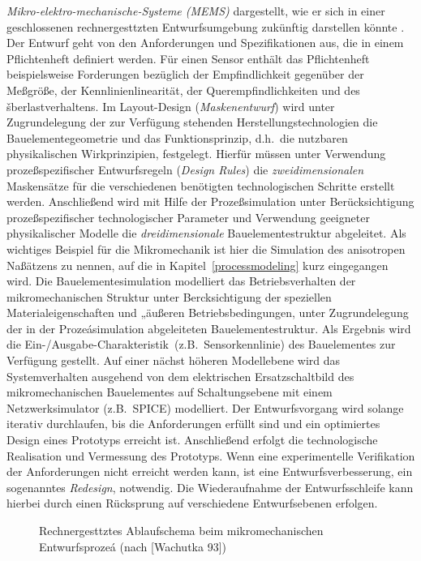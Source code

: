 {\em Mikro-elektro-mechanische-Systeme (MEMS)}
dargestellt, wie er sich in einer geschlossenen rechnergesttzten
Entwurfsumgebung zukünftig darstellen könnte \cite{Wac93}.
Der Entwurf geht von
den Anforderungen und Spezifikationen aus, die in einem Pflichtenheft
definiert werden. Für einen Sensor enthält das Pflichtenheft
beispielsweise Forderungen bezüglich der Empfindlichkeit gegenüber der
Meßgröße, der Kennlinienlinearität, der Querempfindlichkeiten und des
šberlastverhaltens. Im Layout-Design ({\sl Maskenentwurf}) wird unter
Zugrundelegung der zur Verfügung stehenden Herstellungstechnologien die
Bauelementegeometrie und das Funktionsprinzip, d.h.\ die nutzbaren
physikalischen Wirkprinzipien, festgelegt. Hierfür müssen unter Verwendung
prozeßspezifischer Entwurfsregeln ({\sl Design Rules}) die
{\em zweidimensionalen}
Maskensätze für die verschiedenen benötigten technologischen Schritte
erstellt werden.
%
Anschließend wird mit Hilfe der Prozeßsimulation unter Berücksichtigung
prozeßspezifischer technologischer Parameter und Verwendung geeigneter
physikalischer Modelle die {\em dreidimensionale} Bauelementestruktur
abgeleitet. Als wichtiges Beispiel für die Mikromechanik ist hier die
Simulation des anisotropen Naßätzens zu nennen, auf die in
Kapitel~\ref{processmodeling} kurz eingegangen wird.
%
Die Bauelementesimulation modelliert das Betriebsverhalten
der mikromechanischen Struktur unter Bercksichtigung der speziellen
Materialeigenschaften und „äußeren Betriebsbedingungen, unter Zugrundelegung
der in der Prozeásimulation abgeleiteten Bauelementestruktur. Als Ergebnis
wird die \glqq Ein-/Ausgabe-Charakteristik\grqq \, (z.B.\ Sensorkennlinie)
des Bauelementes zur Verfügung gestellt.
%
Auf einer nächst höheren Modellebene wird das Systemverhalten ausgehend von
dem elektrischen Ersatzschaltbild des mikromechanischen Bauelementes auf
Schaltungsebene mit einem Netzwerksimulator (z.B.\ {\sf SPICE})
modelliert. Der Entwurfsvorgang wird solange iterativ durchlaufen, bis
die Anforderungen erfüllt sind und ein optimiertes Design eines
Prototyps erreicht ist. Anschließend erfolgt die technologische
Realisation und Vermessung des Prototyps. Wenn eine experimentelle
Verifikation der Anforderungen nicht erreicht werden kann, ist eine
Entwurfsverbesserung, ein sogenanntes {\em Redesign}, notwendig. Die
Wiederaufnahme der Entwurfsschleife kann hierbei durch einen Rücksprung
auf verschiedene Entwurfsebenen erfolgen.
\begin{figure}[htb]
\begin{center}

\setabbee
\end{center}
\caption{\label{abbmems}
 Rechnergesttztes Ablaufschema beim mikromechanischen Entwurfsprozeá
 (nach [Wachutka 93])}
\end{figure}

